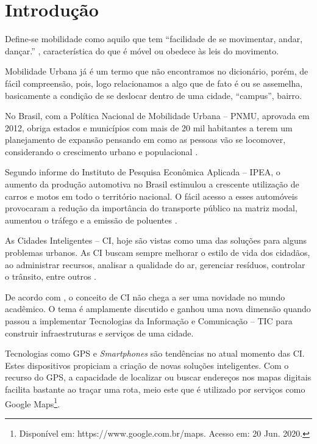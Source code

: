 %
%

\chapter{Introdução}\label{chap:introducao}  

Define-se mobilidade como aquilo que tem “facilidade de se movimentar, andar, dançar.” \cite{mobilidade}, característica do que é móvel ou obedece às leis do movimento. 

Mobilidade Urbana já é um termo que não encontramos no dicionário, porém, de fácil compreensão, %
pois, logo relacionamos a algo que de fato é ou se assemelha, basicamente a condição
de se deslocar dentro de uma cidade, “campus”, bairro. %



No Brasil, com a Política Nacional de Mobilidade Urbana -- PNMU, aprovada em 2012, obriga estados e municípios com mais de 20 mil habitantes a terem um planejamento de expansão pensando em como as pessoas vão se locomover, considerando o crescimento urbano e populacional  \cite{lei12587}.

Segundo informe do Instituto de Pesquisa Econômica Aplicada -- IPEA, o aumento da produção automotiva no Brasil estimulou a crescente utilização de carros e motos em todo o território nacional. O fácil acesso a esses automóveis provocaram a redução da importância do transporte público na matriz modal, aumentou o tráfego e a emissão de poluentes \cite{ipea}.
 
As Cidades Inteligentes -- CI, hoje são vistas como uma das soluções para alguns problemas urbanos. As CI buscam sempre melhorar o estilo de vida dos cidadãos, ao administrar recursos, analisar a qualidade do ar, gerenciar resíduos, controlar o trânsito, entre outros \cite{chourabi}.

De acordo com , o conceito de CI não chega a ser uma novidade no mundo acadêmico. O tema é amplamente discutido e ganhou uma nova dimensão quando passou a implementar Tecnologias da Informação e Comunicação -- TIC para construir infraestruturas e serviços de uma cidade.	

Tecnologias como GPS e \textit{Smartphones} são tendências no atual momento das CI. Estes dispositivos propiciam a criação de novas soluções inteligentes. Com o recurso do GPS, a capacidade de localizar ou buscar endereços nos mapas digitais facilita bastante ao traçar uma rota, meio este que é utilizado por serviços como Google Maps\footnote{Disponível em: https://www.google.com.br/maps. Acesso em: 20 Jun. 2020.}.


